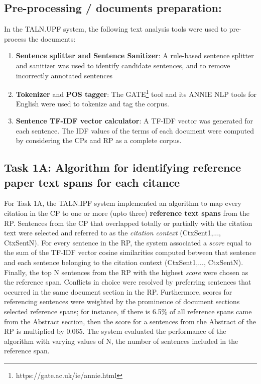 \documentclass[11pt]{article}
\begin{document}
\subsection{Pre-processing / documents preparation:}
In the TALN.UPF system, the following text analysis tools were used to pre-process the documents:
\begin{enumerate}
\vspace{-.3cm}
\item \textbf{Sentence splitter and Sentence Sanitizer}: A rule-based sentence splitter and sanitizer was used to identify candidate sentences, and to remove incorrectly annotated sentences
\vspace{-.3cm}
\item \textbf{Tokenizer} and \textbf{POS tagger}: The GATE\footnote{https://gate.ac.uk/ie/annie.html} tool and its ANNIE NLP tools for English were used to tokenize and tag the corpus.
\vspace{-.3cm}
\item \textbf{Sentence TF-IDF vector calculator}: A TF-IDF vector was generated for each sentence. The IDF values of the terms of each document were computed by considering the CPs and RP as a complete corpus.
\vspace{-.3cm}
\end{enumerate}

\subsection{Task 1A: Algorithm for identifying reference paper text spans for each citance}
For Task 1A, the TALN.IPF system implemented an algorithm to map every citation in the CP to one or more (upto three) \textbf{reference text spans} from the RP. Sentences from the CP that overlapped totally or partially with the citation text were selected and referred to as the \textit{citation context} (CtxSent1,..., CtxSentN).
For every sentence in the RP, the system associated a \textit{score} equal to the sum of the TF-IDF vector cosine similarities computed between that sentence and each sentence belonging to the citation context (CtxSent1,..., CtxSentN). Finally, the top N sentences from the RP with the highest \textit{score} were chosen as the reference span. Conflicts in choice were resolved by preferring sentences that occurred in the same document section in the RP. Furthermore, scores for referencing sentences were weighted by the prominence of document sections selected reference spans; for instance, if there is 6.5\% of all reference spans came from the Abstract section, then the score for a sentences from the Abstract of the RP is multiplied by 0.065. The system evaluated the performance of the algorithm with varying values of N, the number of sentences included in the reference span.
\end{document}
